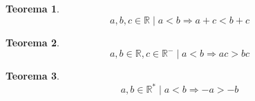 \documentclass[
]{book}
\newtheorem{theorem}{Teorema}[chapter]
\theoremstyle{definition}
\theoremstyle{definition}
\theoremstyle{definition}
\theoremstyle{definition}
\theoremstyle{remark}
\begin{document}
\begin{theorem}
\protect\hypertarget{thm:thmordtrans}{}\label{thm:thmordtrans}\[
a, b, c \in \mathbb{R} \mid a < b \Rightarrow a+c < b+c
\]
\end{theorem}

\begin{theorem}
\protect\hypertarget{thm:thmordmulti}{}\label{thm:thmordmulti}\[
a, b \in \mathbb{R}, c \in \mathbb{R}^- \mid a < b \Rightarrow ac > bc
\]
\end{theorem}

\begin{theorem}
\protect\hypertarget{thm:thmordinv}{}\label{thm:thmordinv}\[
a, b \in \mathbb{R}^* \mid a < b \Rightarrow -a > -b
\]
\end{theorem}

  
\end{document}
